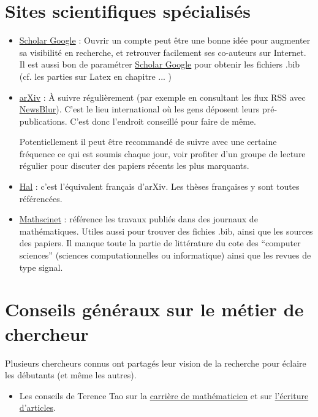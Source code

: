 \section{Sites scientifiques spécialisés}



\begin{itemize}
\item \href{http://scholar.google.com}{Scholar Google} :
Ouvrir un compte peut être une bonne idée pour augmenter sa visibilité en recherche,
et retrouver facilement ses co-auteurs sur Internet.
Il est aussi bon de paramétrer \href{http://scholar.google.com}{Scholar Google} pour
obtenir les fichiers  .bib (cf. les parties sur Latex en chapitre ... )

\item \href{http://arxiv.org/}{arXiv} :
À suivre régulièrement (par exemple en consultant les flux RSS avec 
\href{https://www.newsblur.com/}{NewsBlur}). 
C'est le lieu international
où les gens déposent leurs pré-publications. C'est donc l'endroit conseillé pour faire
de même.

Potentiellement il peut être recommandé de suivre avec une certaine fréquence ce qui est soumis
chaque jour, voir profiter d'un groupe de lecture régulier pour discuter des papiers récents les plus
marquants.

\item \href{http://hal.archives-ouvertes.fr/}{Hal} : c'est l'équivalent français d'arXiv.
Les thèses françaises y sont toutes référencées.


\item \href{http://www.ams.org/mathscinet/}{Mathscinet} : référence les travaux publiés dans
des journaux de mathématiques. Utiles aussi pour trouver des fichies .bib, ainsi que les sources
des papiers. Il manque toute la partie de littérature du cote des ``computer sciences'' (sciences
computationnelles ou informatique) ainsi que les revues de type signal.
\end{itemize}


\section{Conseils généraux sur le métier de chercheur}

Plusieurs chercheurs connus ont partagés leur vision de la recherche
pour éclaire les débutants (et même les autres).

\begin{itemize}
 \item Les conseils de Terence Tao sur la \href{http://terrytao.wordpress.com/career-advice/}{carrière de mathématicien} et sur \href{http://terrytao.wordpress.com/advice-on-writing-papers/}{l'écriture d'articles}.
\end{itemize}




